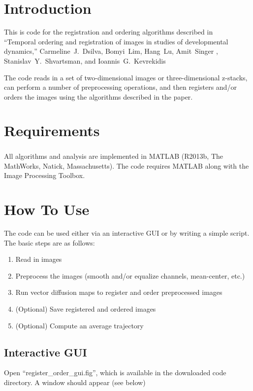 \documentclass[12pt]{article}
\begin{document}
\section{Introduction}

This is code for the registration and ordering algorithms described in \\
``Temporal ordering and registration of images in studies of developmental dynamics,'' Carmeline~J.~Dsilva, Bomyi~Lim, Hang~Lu, Amit~Singer , Stanislav~Y.~Shvartsman, and Ioannis~G.~Kevrekidis

The code reads in a set of two-dimensional images or three-dimensional z-stacks, can perform a number of preprocessing operations, and then registers and/or orders the images using the algorithms described in the paper. 

\section{Requirements}

All algorithms and analysis are implemented in MATLAB\textsuperscript{\textregistered} (R2013b, The MathWorks, Natick, Massachusetts).
%
The code requires MATLAB along with the Image Processing Toolbox. 

\section{How To Use}

The code can be used either via an interactive GUI
or by writing a simple script.
%
The basic steps are as follows:
\begin{enumerate}
   \item Read in images
   \item Preprocess the images (smooth and/or equalize channels, mean-center, etc.)
   \item Run vector diffusion maps to register and order preprocessed images
   \item (Optional) Save registered and ordered images
   \item (Optional) Compute an average trajectory
\end{enumerate}

\subsection{Interactive GUI}

Open ``register\_order\_gui.fig'', which is available in the downloaded code directory.
%
A window should appear (see below)
\end{document}
